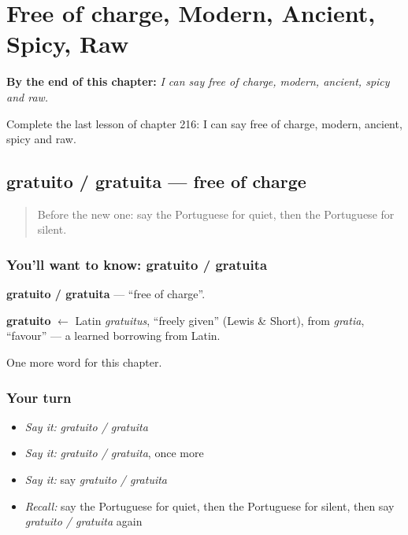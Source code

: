 
\chapter{Free of charge, Modern, Ancient, Spicy, Raw}
\label{ch:pt-free-of-charge-modern-ancient-spicy-raw}

\begin{chapteropening}
\textbf{By the end of this chapter:} \emph{I can say free of charge, modern, ancient, spicy and raw.}

Complete the last lesson of chapter 216: I can say free of charge, modern, ancient, spicy and raw.
\end{chapteropening}

\section[gratuito / gratuita]{gratuito / gratuita — free of charge}

\label{lesson:PT-C216-gratuito-gratuita}



\begin{quote}
Before the new one: say the Portuguese for quiet, then the Portuguese for silent.
\end{quote}

\subsection*{You'll want to know: gratuito / gratuita}
\textbf{gratuito / gratuita} — \textquotedblleft{}free of charge\textquotedblright{}.

\begin{cousinweb}
\textbf{gratuito} $\leftarrow$ Latin \emph{gratuitus}, \textquotedblleft{}freely given\textquotedblright{} (Lewis \& Short), from \emph{gratia}, \textquotedblleft{}favour\textquotedblright{} — a learned borrowing from Latin.
\end{cousinweb}

\begin{grammarlens}[title={What you've built}]
One more word for this chapter.
\end{grammarlens}

\subsection*{Your turn}
\begin{itemize}
\raggedright
  \item \emph{Say it:} \emph{gratuito / gratuita}
  \item \emph{Say it:} \emph{gratuito / gratuita}, once more
  \item \emph{Say it:} say \emph{gratuito / gratuita}
  \item \emph{Recall:} say the Portuguese for quiet, then the Portuguese for silent, then say \emph{gratuito / gratuita} again
\end{itemize}

